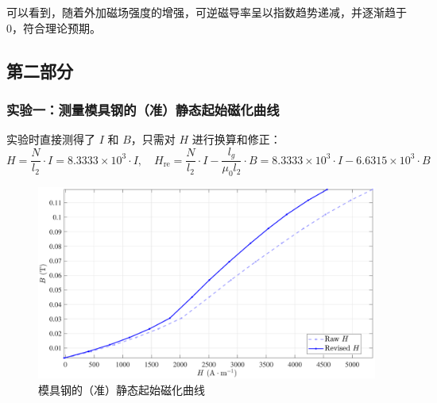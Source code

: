 \documentclass[UTF8]{article}
\theoremstyle{MyLineTheoremStyle} %
\theoremstyle{MyBlockTheoremStyle} %
\theoremstyle{MySubsubsectionStyle} %
\begin{document}
可以看到，随着外加磁场强度的增强，可逆磁导率呈以指数趋势递减，并逐渐趋于 0，符合理论预期。

\subsection{第二部分}
\subsubsection{实验一：测量模具钢的（准）静态起始磁化曲线}

实验时直接测得了 $I$ 和 $B$，只需对 $H$ 进行换算和修正：
\begin{equation}
H = \frac{N}{l_2}\cdot I = 8.3333 \times 10^3 \cdot I,\quad H_{\text{re}} = \frac{N}{l_2}\cdot I - \frac{l_g}{\mu_0 l_2}\cdot B = 8.3333 \times 10^3 \cdot I - 6.6315 \times 10^3 \cdot B
\end{equation}
\begin{figure}[H]\centering
\includegraphics[width=0.85\columnwidth]{assets/2.1/2024-10-29_01-01-14.pdf}
\caption{模具钢的（准）静态起始磁化曲线}\label{2.1图}
\end{figure}
\end{document}
